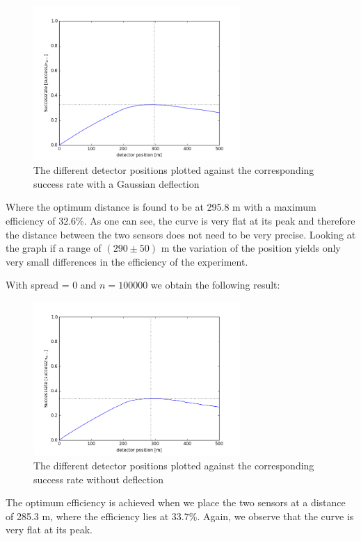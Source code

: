 \documentclass[a4paper,parskip,11pt, DIV12]{scrreprt}
\begin{document}
	\begin{figure}[h] 
		\centering
		\includegraphics[width=0.7\textwidth]{Simulation100kWithSpread.png} 
		\caption{The different detector positions plotted against the corresponding success rate with a Gaussian deflection}   
	\end{figure}
	
	Where the optimum distance is found to be at 295.8 m with a maximum efficiency of 32.6\%. As one can see, the curve is very flat at its peak and therefore the distance between the two sensors does not need to be very precise. Looking at the graph if a range of $(290 \pm 50)$ m the variation of the position yields only very small differences in the efficiency of the experiment.
	
	With spread = 0 and $n = 100000$ we obtain the following result:
	
	\begin{figure}[h] 
		\centering
		\includegraphics[width=0.7\textwidth]{Simulation100kNoSpread.png} 
		\caption{The different detector positions plotted against the corresponding success rate without deflection}   
	\end{figure}
	
	The optimum efficiency is achieved when we place the two sensors at a distance of 285.3 m, where the efficiency lies at 33.7\%. Again, we observe that the curve is very flat at its peak. 
	
\end{document}
